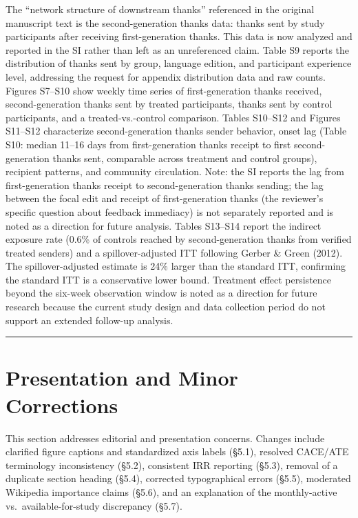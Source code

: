 \documentclass[12pt]{article}
\newcommand{\sectionnote}[1]{\par\smallskip#1\par\medskip}
\begin{document}
The ``network structure of downstream thanks'' referenced in the original manuscript text is the second-generation thanks data: thanks sent by study participants after receiving first-generation thanks. This data is now analyzed and reported in the SI rather than left as an unreferenced claim. Table S9 reports the distribution of thanks sent by group, language edition, and participant experience level, addressing the request for appendix distribution data and raw counts. Figures S7--S10 show weekly time series of first-generation thanks received, second-generation thanks sent by treated participants, thanks sent by control participants, and a treated-vs.-control comparison. Tables S10--S12 and Figures S11--S12 characterize second-generation thanks sender behavior, onset lag (Table S10: median 11--16 days from first-generation thanks receipt to first second-generation thanks sent, comparable across treatment and control groups), recipient patterns, and community circulation. Note: the SI reports the lag from first-generation thanks receipt to second-generation thanks sending; the lag between the focal edit and receipt of first-generation thanks (the reviewer's specific question about feedback immediacy) is not separately reported and is noted as a direction for future analysis. Tables S13--S14 report the indirect exposure rate (0.6\% of controls reached by second-generation thanks from verified treated senders) and a spillover-adjusted ITT following Gerber \& Green (2012). The spillover-adjusted estimate is 24\% larger than the standard ITT, confirming the standard ITT is a conservative lower bound. Treatment effect persistence beyond the six-week observation window is noted as a direction for future research because the current study design and data collection period do not support an extended follow-up analysis.

\bigskip\hrule\bigskip

\section{Presentation and Minor Corrections}

\sectionnote{This section addresses editorial and presentation concerns. Changes include clarified figure captions and standardized axis labels (\S5.1), resolved CACE/ATE terminology inconsistency (\S5.2), consistent IRR reporting (\S5.3), removal of a duplicate section heading (\S5.4), corrected typographical errors (\S5.5), moderated Wikipedia importance claims (\S5.6), and an explanation of the monthly-active vs.\ available-for-study discrepancy (\S5.7).}
\end{document}

